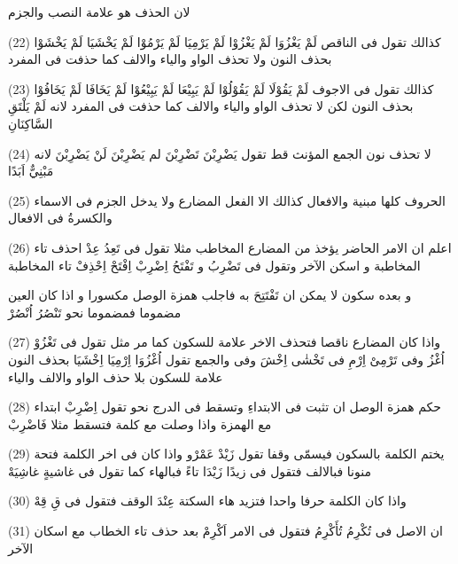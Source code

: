\begin{twocol}
\begin{rightcol}
لان الحذف هو علامة النصب والجزم
\par
(22) كذالك تقول فى الناقص لَمْ يَغْزُوَا لَمْ يَغْزُوْا لَمْ يَرْمِيَا لَمْ يَرْمُوْا لَمْ يَخْشَيَا لَمْ يَخْشَوْا بحذف النون ولا تحذف الواو والياء والالف كما حذفت فى المفرد
\par
(23) كذالك تقول فى الاجوف لَمْ يَقُوْلَا لَمْ يَقُوْلُوْا لَمْ يَبِيْعَا لَمْ يَبِيْعُوْا لَمْ يَخَافَا لَمْ يَخَافُوْا بحذف النون لكن لا تحذف الواو والياء والالف كما حذفت فى المفرد لانه لَمْ يَلْتَقِ السَّاكِنَانِ
\par
(24) لا تحذف نون الجمع المؤنث قط تقول يَضْرِبْنَ تَضْرِبْنَ لم يَضْرِبْنَ لَنْ يَضْرِبْنَ لانه مَبْنِيٌّ اَبَدًا
\par
(25) الحروف كلها مبنية والافعال كذالك الا الفعل المضارع ولا يدخل الجزم فى الاسماء والكسرةُ فى الافعال
\par
(26) اعلم ان الامر الحاضر يؤخذ من المضارع المخاطب مثلا تقول فى تَعِدُ عِدْ احذف تاء المخاطبة و اسكن الآخر وتقول فى تَضْرِبُ و تَفْتَحُ اِضْرِبْ اِفْتَحْ اِحْذِفْ تاء المخاطبة
\end{rightcol}
\begin{leftcol}
و بعده سكون لا يمكن ان تَفْتَتِحَ به فاجلب همزة الوصل مكسورا و اذا كان العين مضموما فمضموما نحو تَنْصُرُ اُنْصُرْ
\par
(27) واذا كان المضارع ناقصا فتحذف الاخر علامة للسكون كما مر مثل تقول فى تَغْزُوْ اُغْزُ وفى تَرْمِىْ اِرْمِ فى تَخْشٰى اِخْشَ وفى  والجمع تقول اُغْزُوَا اِرْمِيَا اِخْشَيَا بحذف النون علامة للسكون بلا حذف الواو والالف والياء
\par
(28) حكم همزة الوصل ان تثبت فى الابتداءِ وتسقط فى الدرج نحو تقول اِضْرِبْ ابتداء مع الهمزة واذا وصلت مع كلمة فتسقط مثلا فَاضْرِبْ
\par
(29) يختم الكلمة بالسكون فيسمّى وقفا تقول زَيْدْ عَمْرْو واذا كان فى اخر الكلمة فتحة منونا فبالالف فتقول فى زيدًا زَيْدَا  تاءً فبالهاء كما تقول فى غاشيةٍ غاشِيَهْ
\par
(30) واذا كان الكلمة حرفا واحدا فتزيد هاء السكتة عِنْدَ الوقف فتقول فى قِ قِهْ
\par
(31) ان الاصل فى تُكْرِمُ تُأَكْرِمُ فتقول فى الامر اَكْرِمْ بعد حذف تاء الخطاب مع اسكان الآخر
\end{leftcol}
\end{twocol}
